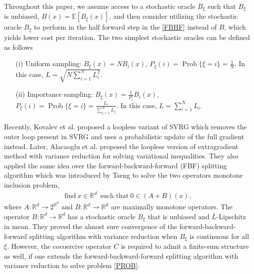 \documentclass[a4paper,12pt]{article}
\theoremstyle{definition}
\DeclareMathOperator{\Pro}{Prob}
\begin{document}
Throughout this paper, we assume access to a stochastic oracle $B_{\xi}$ such that  $B_{\xi}$ is unbiased, $B(x)=\mathbb{E}[B_{\xi}(x)]$, and then consider utilizing the stochastic oracle $B_{\xi}$ to perform in the half forward step in the \eqref{FBHF} instead of $B$, which yields lower cost per iteration. The two simplest stochastic oracles can be defined as follows
\begin{itemize}
\item[(i)] Uniform sampling: $B_{\xi}(x)=NB_i(x)$, $P_{\xi}(i)=\Pro \{\xi=i\}=\frac{1}{N}$. In this case, $L=\sqrt{N\sum_{i=1}^N L_i^2}$.
\item[(ii)] Importance sampling: $B_{\xi}(x)=\frac{1}{P_i}B_i(x)$, $ P_{\xi}(i)=\Pro\{\xi=i\}=\frac{L_i}{\sum_{j=1}^N L_j}$. In this case, $L=\sum_{i=1}^N L_i$.
\end{itemize}

Recently, Kovalev et al.\cite{KHR} proposed a loopless variant of SVRG \cite{SVRG}
which removes the outer loop present in SVRG and uses a probabilistic update of the full gradient instead. Later, Alacaoglu et al. \cite{Alacaoglu-Malitsky} proposed the loopless version of extragradient method with variance reduction for solving variational inequalities. They also applied the same idea over the forward-backward-forward (FBF) splitting algorithm which was introduced by Tseng \cite{Tseng} to solve the two operators monotone inclusion problem,
\begin{eqnarray*}
\mbox{find} \ x \in \mathbb{R}^d \ \ \mbox{such that} \ 0\in (A+B)(x),
\end{eqnarray*}
where $A: \mathbb{R}^d \rightarrow 2^{\mathbb{R}^d}$ and $B: \mathbb{R}^d \rightarrow \mathbb{R}^d$ are maximally monotone operators. The operator $B: \mathbb{R}^d \rightarrow \mathbb{R}^d$ has a stochastic oracle $B_{\xi}$ that is unbiased and $\bar{L}$-Lipschitz in mean. They proved the almost sure convergence of the forward-backward-forward splitting algorithm with variance reduction when $B_{\xi}$ is continuous for all $\xi$. However,  the cocoercive operator $C$ is required to admit a finite-sum structure as well, if one extends the forward-backward-forward splitting algorithm with variance reduction to solve problem \eqref{PROB}.
\end{document}
